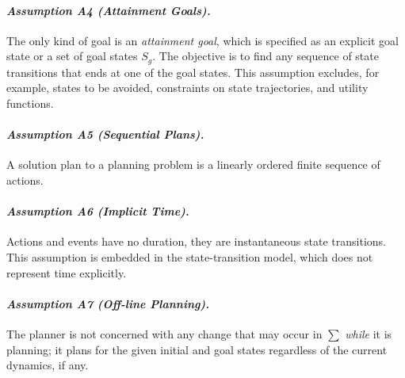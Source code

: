 \paragraph*{\textit{Assumption A4 (Attainment Goals).}} The only kind of goal is
an \textit{attainment goal}, which is specified as an explicit goal state or a
set of goal states $S_g$. The objective is to find any sequence of state
transitions that ends at one of the goal states. This assumption excludes, for
example, states to be avoided, constraints on state trajectories, and utility
functions.

\paragraph*{\textit{Assumption A5 (Sequential Plans).}} A solution plan to a
planning problem is a linearly ordered finite sequence of actions.

\paragraph*{\textit{Assumption A6 (Implicit Time).}} Actions and events have no
duration, they are instantaneous state transitions. This assumption is embedded
in the state-transition model, which does not represent time explicitly.

\paragraph*{\textit{Assumption A7 (Off-line Planning).}} The planner is not
concerned with any change that may occur in $\sum$ \textit{while} it is
planning; it plans for the given initial and goal states regardless of the
current dynamics, if any.

